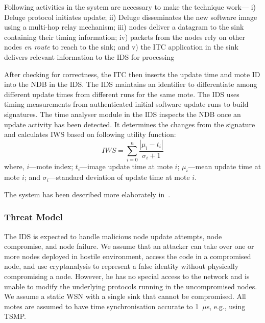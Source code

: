 \documentclass{CRPITStyle}
\renewcommand{\cite}{\citep}
\begin{document}
Following activities in the system are necessary to make the technique work---%
i) Deluge protocol initiates update;
ii) Deluge disseminates the new software image using a multi-hop relay mechanism; 
iii) nodes deliver a datagram to the sink containing their timing information;
iv) packets from the nodes rely on other nodes \emph{en route} to reach to the sink; and
v) the ITC application in the sink delivers relevant information to the IDS for processing 

After checking for correctness, the ITC then inserts the update time and mote ID into the NDB in the IDS.
The IDS maintains an identifier to differentiate among different update times from different runs for the same mote.
The IDS uses timing measurements from authenticated initial software update runs to build signatures.
The time analyser module in the IDS inspects the NDB once an update activity has been detected. 
It determines the changes from the signature and calculates IWS based on following utility function:
\begin{equation}
\label{eqn2} 
	\mathit{IWS} = \sum \limits_{i=0}^{n} \frac{\left| \mu_i - t_i \right|}{\sigma_i + 1}
\end{equation}
where, 
$\mathit{i}$---mote index; %
$\mathit{t_i}$---image update time at mote $\mathit{i}$;  
$\mathit{\mu_i}$---mean update time at mote $\mathit{i}$;  and 
$\mathit{\sigma_i}$---standard deviation of update time at mote $\mathit{i}$. 

The system has been described more elaborately in~\cite{aalam15}.

\subsubsection*{Threat Model}
The IDS is expected to handle malicious node update attempts, node compromise, and node failure.
We assume that an  attacker  can take over one or more nodes deployed in hostile environment, access the code in a compromised node, and use cryptanalysis to represent a false identity without physically compromising a node.
However, he has  no special  access to  the  network and is unable to modify the underlying protocols running in the uncompromised nodes.
We assume a static WSN with a single  sink that cannot be compromised. All motes are assumed to have time synchronisation accurate to 1~$\mu$s, e.g., using TSMP. %
\end{document}
